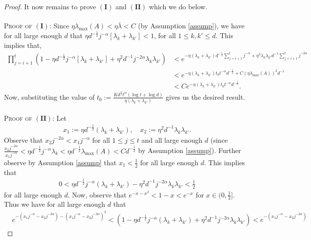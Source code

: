 \documentclass[11pt, reqno,english]{amsart}
\begin{document}
\begin{proof}
It now remains to prove $\mathbf{(I)}$ and $\mathbf{(II)}$ which we do below.
\\\\
\textsc{Proof of $(\mathbf{I})$:} Since $\eta \lambda_{\max}(A) < \eta \bar{\lambda} < C$ (by Assumption \ref{assump}), we have for all large enough $d$ that $\eta d^{-\frac{1}{2}}j^{-\alpha}[\lambda_k + \lambda_{k'}] < 1$, for all $1 \leq k, k' \leq d$. This implies that, 
\begin{align*}
\prod_{j = i+1}^t (1 - \eta d^{-\frac{1}{2}}j^{-\alpha} [\lambda_k + \lambda_{k'}] + \eta^2 d^{-1} j^{-2\alpha} \lambda_{k}\lambda_{k'}) &< e^{-\eta (\lambda_k + \lambda_{k'}) d^{-\frac{1}{2}} \sum_{j = i+1}^t j^{-\alpha} + \eta^2 \lambda_{k} \lambda_{k'}d^{-1} \sum_{j = i+1}^tj^{-2\alpha}} 
\\&< e^{-\eta (\lambda_k + \lambda_{k'})t_0 t^{-\alpha}d^{-\frac{1}{2}} + C(\eta \lambda_{\max}(A))^2d^{-1}}
\\&< Ce^{-\eta (\lambda_k + \lambda_{k'}) t_0 t^{-\alpha} d^{-\frac{1}{2}}}.
\end{align*}
Now, substituting the value of $t_0 := \frac{Kd^{\frac{1}{2}}t^{\alpha} (\log t + \log d)}{\eta (\lambda_k + \lambda_{k'})}$ gives us the desired result.
\\\\
\textsc{Proof of $(\mathbf{II})$:} Let 
\begin{align*}
x_1 := \eta d^{-\frac{1}{2}}(\lambda_k + \lambda_{k'}), \quad x_2 := \eta^2 d^{-1} \lambda_k \lambda_{k'}.
\end{align*}
Observe that $x_2j^{-2\alpha} < x_1j^{-\alpha}$ for all $1 \leq j \leq t$ and all large enough $d$ (since $\frac{x_2j^{-2\alpha}}{x_1j^{-\alpha}} < \eta d^{-\frac{1}{2}} j^{-\alpha} \lambda_k < \eta d^{-\frac{1}{2}} \lambda_{\max}(A) <  Cd^{-\frac{1}{2}}$ by Assumption \ref{assump}). Further observe by Assumption \ref{assump} that $x_1 < \frac{1}{2}$ for all large enough $d$. This implies that
\begin{align*}
0 < \eta d^{-\frac{1}{2}}j^{-\alpha} (\lambda_k + \lambda_{k'}) - \eta^2 d^{-1} j^{-2\alpha}\lambda_{k} \lambda_{k'} < \frac{1}{2}
\end{align*}
for all large enough $d$. Now, observe that $e^{- x - x^2} < 1 - x < e^{-x}$ for $x \in (0, \frac{1}{2}]$. Thus we have for all large enough $d$ that
\begin{align*}
&e^{- (x_1j^{-\alpha} - x_2j^{-2\alpha}) - (x_1j^{-\alpha} - x_2j^{-2\alpha})^2}<  (1 - \eta d^{-\frac{1}{2}}j^{-\alpha} (\lambda_k + \lambda_{k'}) + \eta^2 d^{-1} j^{-2\alpha} \lambda_{k} \lambda_{k'}) < e^{-(x_1j^{-\alpha} - x_2j^{-2\alpha})}

\end{align*}
\end{proof}
\end{document}
